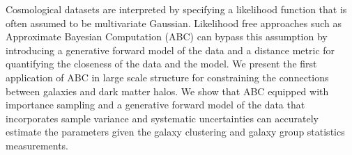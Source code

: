 Cosmological datasets are interpreted by specifying a likelihood function that is often assumed to be multivariate Gaussian. Likelihood free approaches such as Approximate Bayesian Computation (ABC) can bypass this assumption by introducing a generative forward model of the data and a distance metric for quantifying the closeness of the data and the model. We present the first application of ABC in large scale structure for constraining the connections between galaxies and dark matter halos. We show that ABC equipped with importance sampling and a generative forward model of the data that incorporates sample variance and systematic uncertainties can accurately estimate the parameters given the galaxy clustering and galaxy group statistics measurements.  

